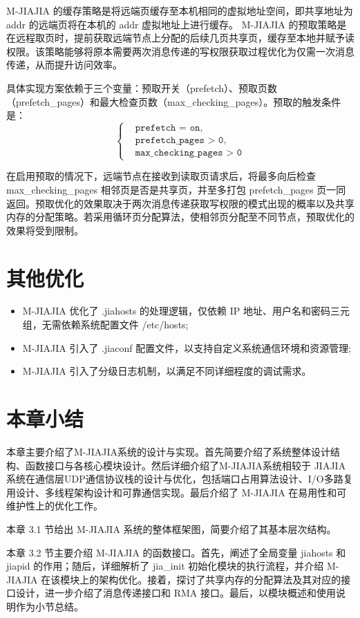 {M-JIAJIA 的缓存策略是将远端页缓存至本机相同的虚拟地址空间，即共享地址为 addr 的远端页将在本机的 addr 虚拟地址上进行缓存。
M-JIAJIA 的预取策略是在远程取页时，提前获取远端节点上分配的后续几页共享页，缓存至本地并赋予读权限。该策略能够将原本需要两次消息传递的写权限获取过程优化为仅需一次消息传递，从而提升访问效率。

具体实现方案依赖于三个变量：预取开关（prefetch）、预取页数（prefetch\_pages）和最大检查页数（max\_checking\_pages）。预取的触发条件是：
$$
\left\{
\begin{aligned}
    &\texttt{prefetch = on}, \\
    &\texttt{prefetch\_pages > 0}, \\
    &\texttt{max\_checking\_pages > 0}
\end{aligned}
\right.
$$

在启用预取的情况下，远端节点在接收到读取页请求后，将最多向后检查 max\_checking\_pages 相邻页是否是共享页，并至多打包 prefetch\_pages 页一同返回。预取优化的效果取决于两次消息传递获取写权限的模式出现的概率以及共享内存的分配策略。若采用循环页分配算法，使相邻页分配至不同节点，预取优化的效果将受到限制。


\section{其他优化}
\begin{itemize}
    \item M-JIAJIA 优化了 .jiahosts 的处理逻辑，仅依赖 IP 地址、用户名和密码三元组，无需依赖系统配置文件 /etc/hosts;
    \item M-JIAJIA 引入了 .jiaconf 配置文件，以支持自定义系统通信环境和资源管理;
    \item M-JIAJIA 引入了分级日志机制，以满足不同详细程度的调试需求。
\end{itemize}

\section{本章小结}
本章主要介绍了M-JIAJIA系统的设计与实现。首先简要介绍了系统整体设计结构、函数接口与各核心模块设计。然后详细介绍了M-JIAJIA系统相较于 JIAJIA 系统在通信层UDP通信协议栈的设计与优化，包括端口占用算法设计、I/O多路复用设计、多线程架构设计和可靠通信实现。最后介绍了 M-JIAJIA 在易用性和可维护性上的优化工作。

本章 3.1 节给出 M-JIAJIA 系统的整体框架图，简要介绍了其基本层次结构。

本章 3.2 节主要介绍 M-JIAJIA 的函数接口。首先，阐述了全局变量 jiahosts 和 jiapid 的作用；随后，详细解析了 jia\_init 初始化模块的执行流程，并介绍 M-JIAJIA 在该模块上的架构优化。接着，探讨了共享内存的分配算法及其对应的接口设计，进一步介绍了消息传递接口和 RMA 接口。最后，以模块概述和使用说明作为小节总结。

}
